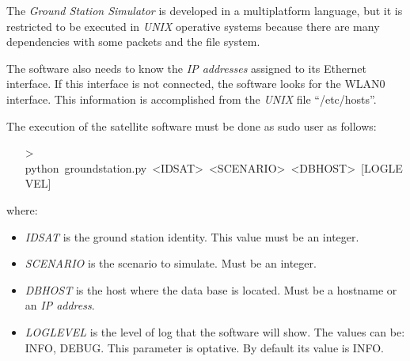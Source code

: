 The \emph{Ground Station Simulator} is developed in a multiplatform language, but it is restricted to be executed in \emph{UNIX} operative systems because there are many dependencies with some packets and the file system.

The software also needs to know the \emph{IP addresses} assigned to its Ethernet interface. If this interface is not connected, the software looks for the WLAN0 interface. This information is accomplished from the \emph{UNIX} file ``/etc/hosts''.

The execution of the satellite software must be done as sudo user as follows:
\begin{itemize}
\item[>]python~groundstation.py~<IDSAT>~<SCENARIO>~<DBHOST>~[LOGLEVEL]
\end{itemize}

where:
\begin{itemize}
\item \emph{IDSAT} is the ground station identity. This value must be an integer.
\item \emph{SCENARIO} is the scenario to simulate. Must be an integer.
\item \emph{DBHOST} is the host where the data base is located. Must be a hostname or an \emph{IP address}.
\item \emph{LOGLEVEL} is the level of log that the software will show. The values can be: INFO, DEBUG. This parameter is optative. By default its value is INFO.
\end{itemize}

